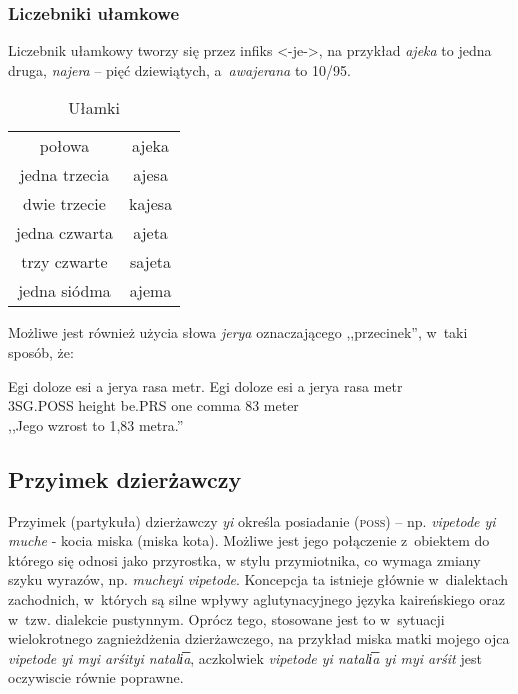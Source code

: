\begin{spacing}{1.1}
\subsubsection{Liczebniki ułamkowe}

Liczebnik ułamkowy tworzy się przez infiks <-je->, na przykład \emph{ajeka} to
jedna druga, \emph{najera} -- pięć dziewiątych, a~\emph{awajerana} to 10/95.

\begin{table}[ht]
	\centering
	\caption{Ułamki}
	\begin{tabular}{cc} \toprule
		połowa & ajeka \\
		jedna trzecia & ajesa \\
		dwie trzecie & kajesa \\
		jedna czwarta & ajeta \\
		trzy czwarte & sajeta \\
		jedna siódma & ajema  \\\bottomrule
	\end{tabular}
	\label{tab:numerals4}
\end{table}

Możliwe jest również użycia słowa \emph{jerya} oznaczającego ,,przecinek'',
w~taki sposób, że:

\begin{exe}
	\ex
	\trans Egi doloze esi a jerya rasa metr.
	\gll Egi doloze esi a jerya rasa metr\\
	3SG.POSS height be.PRS one comma 83 meter\\
	\glt  ,,Jego wzrost to 1,83 metra.''
\end{exe}

\subsection{Przyimek dzierżawczy}

Przyimek (partykuła) dzierżawczy \emph{yi} określa posiadanie (\textsc{poss}) --
np. \emph{vipetode yi muche} - kocia miska (miska kota). Możliwe jest jego
połączenie z~obiektem do którego się odnosi jako przyrostka, w stylu
przymiotnika, co wymaga zmiany szyku wyrazów, np. \emph{mucheyi vipetode}.
Koncepcja ta istnieje głównie w~dialektach zachodnich, w~których są silne wpływy
aglutynacyjnego języka kaireńskiego oraz w~tzw. dialekcie pustynnym. Oprócz
tego, stosowane jest to w~sytuacji wielokrotnego zagnieżdżenia dzierżawczego, na
przykład miska matki mojego ojca \emph{vipetode yi myi arśityi natali͞a},
aczkolwiek \emph{vipetode yi natali͞a yi myi arśit} jest oczywiscie równie
poprawne. 


\end{spacing}
